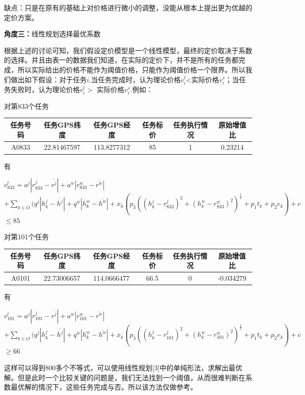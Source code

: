 \documentclass{ctexart}
\begin{document}
缺点：只是在原有的基础上对价格进行微小的调整，没能从根本上提出更为优越的定价方案。



\textbf{角度三：}线性规划选择最优系数

根据上述的讨论可知，我们假设定价模型是一个线性模型，最终的定价取决于系数的选择。并且由表一的数据我们知道，在实际的定价下，并不是所有的任务都完成，所以实际给出的价格不能作为阈值价格，只能作为阈值价格一个限界。所以我们做出如下假设：对于任务$i$,当任务完成时，认为理论价格$v^{l}_{i}$<实际价格$v^{s}_{i}$；当任务失败时，认为理论价格$v^{l}_{i}>$ 实际价格$v^{s}_{i}$.例如：

对第833个任务

\begin{table}[!h]\scriptsize\centering
 \begin{tabular}{|c|c|c|c|c|c|}
 \hline
 任务号码&任务GPS纬度&任务GPS经度&任务标价&任务执行情况&原始增值比\\
 \hline
 A0833&22.81467597&113.8277312&85&1&0.23214\\
 \hline
 \end{tabular}
 \end{table}
  有

  $v^{l}_{833}=a^{j}|r^{j}_{833}-\overline{r^{j}}|+a^{w}|r^{w}_{833}-\overline{r^{w}}|$
$+\sum\limits_{k\in O}(q^{j}|h^{j}_{k}-\overline{h^{j}}|+q^{w}|h^{w}_{k}-\overline{h^{w}}|+x_{k}(p_{3}((h^{j}_{k}-r^{j}_{833})^{2}+(h^{w}_{k}-r^{w}_{833})^{2})^{\frac{1}{2}}+p_{1}t_{k}+p_{2}e_{k})+c $
$\leq 85$

 对第101个任务
 \begin{table}[!h]\scriptsize\centering
 \begin{tabular}{|c|c|c|c|c|c|}
 \hline
 任务号码&任务GPS纬度&任务GPS经度&任务标价&任务执行情况&原始增值比\\
 \hline
 A0101&22.73006657&114.0666477&66.5&0&-0.034279\\
 \hline
 \end{tabular}
 \end{table}

 有

 $v^{l}_{101}=a^{j}|r^{j}_{101}-\overline{r^{j}}|+a^{w}|r^{w}_{101}-\overline{r^{w}}|$
$+\sum\limits_{k\in O}(q^{j}|h^{j}_{k}-\overline{h^{j}}|+q^{w}|h^{w}_{k}-\overline{h^{w}}|+x_{k}(p_{3}((h^{j}_{k}-r^{j}_{101})^{2}+(h^{w}_{k}-r^{w}_{101})^{2})^{\frac{1}{2}}+p_{1}t_{k}+p_{2}e_{k})+c $
$\geq 66$

这样可以得到800多个不等式，可以使用线性规划[3]中的单纯形法，求解出最优解。但是此时一个比较关键的问题是，我们无法找到一个阈值，从而很难判断在系数最优解的情况下，这些任务完成与否。所以该方法仅做参考。
\end{document}
